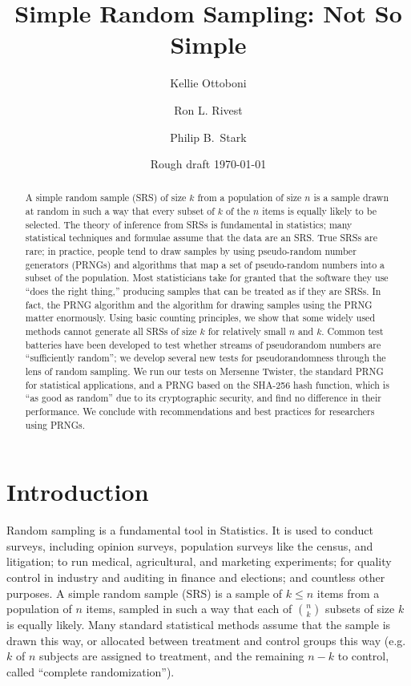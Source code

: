 \documentclass[12pt]{article}
\begin{document}
\title{Simple Random Sampling: Not So Simple}
\author{Kellie Ottoboni
\and
Ron L. Rivest
\and
Philip B.~Stark 
}

\date{Rough draft \today}




\maketitle

\begin{abstract}
\small
A simple random sample (SRS) of size $k$ from a population of size $n$ is a sample drawn 
at random in such a way that every subset of $k$ of the $n$ items is equally likely to be selected. 
The theory of inference from SRSs is fundamental in statistics;
many statistical techniques and formulae assume that the data are an SRS.
True SRSs are rare; in practice, people tend to draw samples by using pseudo-random number generators 
(PRNGs) and algorithms that map a set of pseudo-random numbers into a subset of the population. 
Most statisticians take for granted that the software they use ``does the right thing,''
producing samples that can be treated as if they are SRSs.
In fact, the PRNG algorithm and the algorithm for drawing samples using the PRNG matter
enormously.
Using basic counting principles, we show that some widely used methods cannot generate all SRSs of size $k$ for relatively small $n$ and $k$.
Common test batteries have been developed to test whether streams of pseudorandom numbers are ``sufficiently random''; we develop several new tests for pseudorandomness through the lens of random sampling.
We run our tests on Mersenne Twister, the standard PRNG for statistical applications, and a PRNG 
based on the SHA-256 hash function, which is ``as good as random'' due to its cryptographic security, and find
no difference in their performance.
We conclude with recommendations and best practices for researchers using PRNGs.
\end{abstract}


\newpage
\tableofcontents
\newpage 

\section{Introduction}
Random sampling is a  fundamental tool in Statistics.
It is used to conduct surveys, including opinion surveys, population surveys like the census, and litigation; 
to run medical, agricultural, and marketing experiments; 
for quality control in industry and auditing in finance and elections;
and countless other purposes.
A simple random sample (SRS) is a sample of $k \leq n$ items from a population of $n$ items,
sampled in such a way that each of ${n \choose k}$ subsets of size $k$ is equally likely.
Many standard statistical methods assume that the sample is drawn this way, 
or allocated between treatment and control groups this way
(e.g. $k$ of $n$ subjects are assigned to treatment, and the remaining $n-k$ to control, 
called ``complete randomization'').
\end{document}

